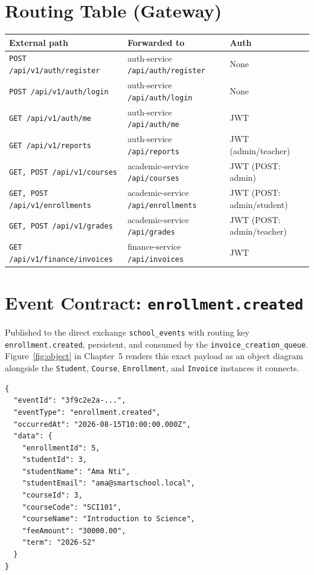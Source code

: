 \documentclass[11pt,a4paper]{report}
\begin{document}
\section{Routing Table (Gateway)}
\begin{longtable}{L{5.0cm} L{6.0cm} p{2.4cm}}
\toprule
\textbf{External path} & \textbf{Forwarded to} & \textbf{Auth} \\
\midrule
\endhead
\texttt{POST /api/v1/auth/register} & auth-service \texttt{/api/auth/register} & None \\
\texttt{POST /api/v1/auth/login} & auth-service \texttt{/api/auth/login} & None \\
\texttt{GET /api/v1/auth/me} & auth-service \texttt{/api/auth/me} & JWT \\
\texttt{GET /api/v1/reports} & auth-service \texttt{/api/reports} & JWT (admin/teacher) \\
\texttt{GET, POST /api/v1/courses} & academic-service \texttt{/api/courses} & JWT (POST: admin) \\
\texttt{GET, POST /api/v1/enrollments} & academic-service \texttt{/api/enrollments} & JWT (POST: admin/student) \\
\texttt{GET, POST /api/v1/grades} & academic-service \texttt{/api/grades} & JWT (POST: admin/teacher) \\
\texttt{GET /api/v1/finance/invoices} & finance-service \texttt{/api/invoices} & JWT \\
\bottomrule
\end{longtable}

\section{Event Contract: \texttt{enrollment.created}}
Published to the direct exchange \texttt{school\_events} with routing key
\texttt{enrollment.created}, persistent, and consumed by the
\texttt{invoice\_creation\_queue}. Figure~\ref{fig:object} in Chapter~5
renders this exact payload as an object diagram alongside the
\texttt{Student}, \texttt{Course}, \texttt{Enrollment}, and \texttt{Invoice}
instances it connects.

\begin{verbatim}
{
  "eventId": "3f9c2e2a-...",
  "eventType": "enrollment.created",
  "occurredAt": "2026-08-15T10:00:00.000Z",
  "data": {
    "enrollmentId": 5,
    "studentId": 3,
    "studentName": "Ama Nti",
    "studentEmail": "ama@smartschool.local",
    "courseId": 3,
    "courseCode": "SCI101",
    "courseName": "Introduction to Science",
    "feeAmount": "30000.00",
    "term": "2026-S2"
  }
}
\end{verbatim}
\end{document}
